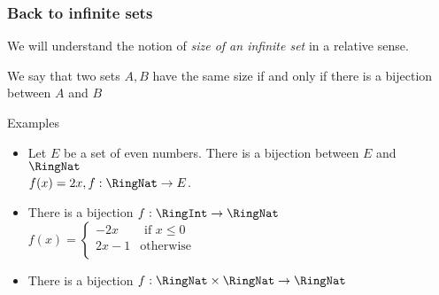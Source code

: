 \begin{frame}[fragile]
\frametitle{Back to infinite sets}
We will understand the notion of {\it size of an infinite set} in a relative sense.

\begin{definition}
We say that two sets $A,B$ have the same size if and only if there is a bijection between $A$ and $B$
\end{definition}


Examples

\begin{itemize}
\item Let $E$ be a set of even numbers. There is a bijection between $E$ and $\RingNat$\\


$f(x) = 2x, f: \RingNat \rightarrow E$.


\item There is a bijection $f: \RingInt \rightarrow \RingNat$\\


$f(x) = \left\{\begin{array}{cc}
				-2x & \mbox{ if } x \leq 0\\
				2x-1 & \mbox{otherwise}\\
			\end{array}	
				\right.$


\item There is a bijection $f: \RingNat \times \RingNat \rightarrow \RingNat$\\

%
%
%
%
\end{itemize}
\end{frame}
